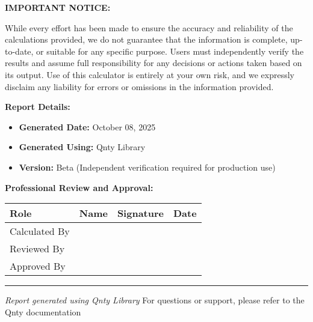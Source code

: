 \documentclass[11pt,a4paper]{article}
\begin{document}
\noindent\textbf{IMPORTANT NOTICE:}

\noindent While every effort has been made to ensure the accuracy and reliability of the calculations provided, we do not guarantee that the information is complete, up-to-date, or suitable for any specific purpose. Users must independently verify the results and assume full responsibility for any decisions or actions taken based on its output. Use of this calculator is entirely at your own risk, and we expressly disclaim any liability for errors or omissions in the information provided.

\vspace{1em}

\noindent\textbf{Report Details:}
\begin{itemize}
\item \textbf{Generated Date:} October 08, 2025
\item \textbf{Generated Using:} Qnty Library
\item \textbf{Version:} Beta (Independent verification required for production use)
\end{itemize}

\vspace{2em}

\noindent\textbf{Professional Review and Approval:}

\vspace{1em}

\begin{longtable}{|p{3cm}|p{4cm}|p{4cm}|p{2.5cm}|}
\hline
\textbf{Role} & \textbf{Name} & \textbf{Signature} & \textbf{Date} \\
\hline
\hline
Calculated By & \rule{0pt}{1.5cm} & & \\
\hline
Reviewed By & \rule{0pt}{1.5cm} & & \\
\hline
Approved By & \rule{0pt}{1.5cm} & & \\
\hline
\end{longtable}

\vspace{1em}

\begin{center}
\rule{\textwidth}{0.4pt}
\vspace{0.5em}
\textit{Report generated using Qnty Library}
\vspace{0.5em}
{\footnotesize For questions or support, please refer to the Qnty documentation}
\end{center}
\end{document}
